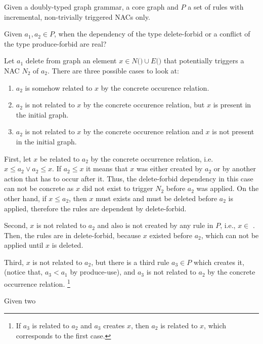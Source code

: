 \begin{definition}[Sketch] Given \doublyTypedGraphGrammarCore{} a doubly-typed graph grammar, \coreGraph{} a core graph and $P$ a set of rules with incremental, non-trivially triggered NACs only.

Given $a_1, a_2 \in P$, when the dependency of the type delete-forbid or a conflict of the type produce-forbid are real?

Let $a_1$ delete from graph \coreGraph{} an element $x \in N($\coreGraph$) \cup E($\coreGraph$)$ that potentially triggers a NAC $N_2$ of $a_2$. There are three possible cases to look at:

\begin{enumerate}
  \item $a_2$ is somehow related to $x$ by the concrete occurence relation.
  \item $a_2$ is not related to $x$ by the concrete occurence relation, but $x$ is present in the initial graph.
  \item $a_2$ is not related to $x$ by the concrete occurence relation and $x$ is not present in the initial graph.
\end{enumerate}

First, let $x$ be related to $a_2$ by the concrete occurrence relation, i.e. \mbox{$x \leq a_2 \lor a_2 \leq x$}. If $a_2 \leq x$ it means that $x$ was either created by $a_2$ or by another action that has to occur after it. Thus, the delete-forbid dependency in this case can not be concrete as $x$ did not exist to trigger $N_2$ before $a_2$ was applied. On the other hand, if $x \leq a_2$, then $x$ must exists and must be deleted before $a_2$ is applied, therefore the rules are dependent by delete-forbid.

Second, $x$ is not related to $a_2$ and also is not created by any rule in $P$, i.e., $x \in$ \coreGraph{}. Then, the rules are in delete-forbid, because $x$ existed before $a_2$, which can not be applied until $x$ is deleted.

  Third, $x$ is not related to $a_2$, but there is a third rule $a_3 \in P$ which creates it, (notice that, $a_3 < a_1$ by produce-use), and $a_3$ is not related to $a_2$ by the concrete occurrence relation. \footnote{If $a_3$ is related to $a_2$ and $a_3$ creates $x$, then $a_2$ is related to $x$, which corresponds to the first case.}
\end{definition}

\begin{definition} Given two


\end{definition}

